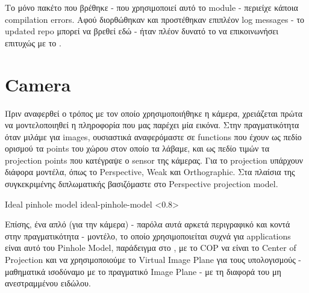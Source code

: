 Το μόνο  πακέτο που βρέθηκε \cite{ros-adafruit-10dof-imu-original} - που χρησιμοποιεί αυτό το module - περιείχε κάποια compilation errors. Αφού διορθώθηκαν και προστέθηκαν επιπλέον log messages - το updated repo μπορεί να βρεθεί εδώ \cite{ros-adafruit-10dof-imu-cspyridakis} - ήταν πλέον δυνατό το  να επικοινωνήσει επιτυχώς με το .


\section{Camera} \label{sec:design-implementation-camera}

Πριν αναφερθεί ο τρόπος με τον οποίο χρησιμοποιήθηκε η κάμερα, χρειάζεται πρώτα να μοντελοποιηθεί η πληροφορία που μας παρέχει μία εικόνα. Στην πραγματικότητα όταν μιλάμε για images, ουσιαστικά αναφερόμαστε σε functions που έχουν ως πεδίο ορισμού τα  points του χώρου στον οποίο τα λάβαμε, και ως πεδίο τιμών τα  projection points που κατέγραψε ο sensor της κάμερας. Για το projection υπάρχουν διάφορα μοντέλα, όπως το Perspective, Weak και Orthographic. Στα πλαίσια της συγκεκριμένης διπλωματικής βασιζόμαστε στο Perspective projection model.


%
{Ideal pinhole model}%
{ideal-pinhole-model}%
<0.8>

Επίσης, ένα απλό (για την κάμερα) - παρόλα αυτά αρκετά περιγραφικό και κοντά στην πραγματικότητα - μοντέλο, το οποίο χρησιμοποιείται συχνά για  applications είναι αυτό του Pinhole Model, παράδειγμα στο , με το COP να είναι το Center of Projection και να χρησιμοποιούμε το Virtual Image Plane για τους υπολογισμούς - μαθηματικά ισοδύναμο με το πραγματικό Image Plane - με τη διαφορά του μη ανεστραμμένου ειδώλου.

